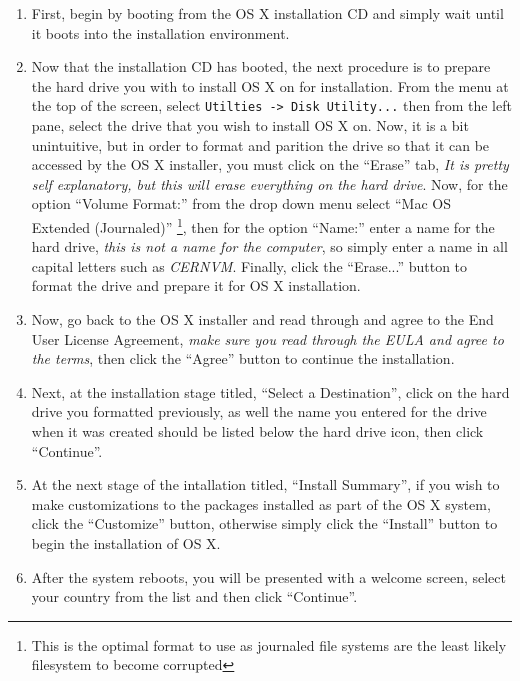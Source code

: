 \begin{enumerate}
\item	First, begin by booting from the OS X installation CD and simply wait until it boots into the installation environment.

\item	Now that the installation CD has booted, the next procedure is to prepare the hard drive you with to install OS X on 
		for installation. From the menu at the top of the screen, select \verb|Utilties -> Disk Utility...| then from the left 
		pane, select the drive that you wish to install OS X on. Now, it is a bit unintuitive, but in order to format and parition 
		the drive so that it can be accessed by the OS X installer, you must click on the ``Erase'' tab, \emph{It is pretty self 
		explanatory, but this will erase everything on the hard drive}. Now, for the option ``Volume Format:'' from the drop down menu
		select ``Mac OS Extended (Journaled)'' \footnote{This is the optimal format to use as journaled file systems are the least likely
		filesystem to become corrupted}, then for the option ``Name:'' enter a name for the hard drive, \emph{this is not a name for the
		computer}, so simply enter a name in all capital letters such as \emph{CERNVM}. Finally, click the ``Erase...'' button to format
		the drive and prepare it for OS X installation.
		
\item	Now, go back to the OS X installer and read through and agree to the End User License Agreement, \emph{make sure you read through
		the EULA and agree to the terms}, then click the ``Agree'' button to continue the installation.
		
\item	Next, at the installation stage titled, ``Select a Destination'', click on the hard drive you formatted previously, as well 
		the name you entered for the drive when it was created should be listed below the hard drive icon, then click ``Continue''.
		
\item	At the next stage of the intallation titled, ``Install Summary'', if you wish to make customizations to the packages installed
		as part of the OS X system, click the ``Customize'' button, otherwise simply click the ``Install'' button to begin the
		installation of OS X.
		
\item	After the system reboots, you will be presented with a welcome screen, select your country from the list and then click
		``Continue''.
		

\end{enumerate}
